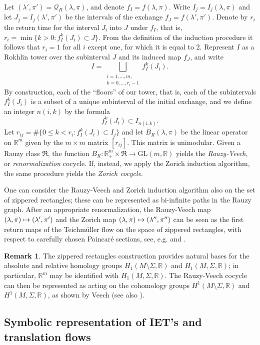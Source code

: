 \documentclass[10pt]{amsart}
\let\mathcal\mathscr
\def\mto{\mathchoice{\longmapsto}{\mapsto}{\mapsto}{\mapsto}}
\newcommand{\GL}{\mathrm{GL}}
\theoremstyle{plain}
\theoremstyle{definition}
\newtheorem*{rem*}{Remark}
\let\lam\lambda
\let\Sig\Sigma
\newcommand\FrR{\mathfrak{R}}
\newcommand\Qk{\mathcal{Q}}
\newcommand{\R}{\mathbb{R}}
\newcommand\be{\begin{equation}}
\newcommand\ee{\end{equation}}
\providecommand{\eg}{e.g.}\providecommand{\ie}{i.e.}\providecommand{\etc}{etc.}\providecommand{\resp}{resp.}\providecommand{\cf}{cf.}
\begin{document}
Let $(\lam',\pi')=\Qk_R(\lam,\pi)$, and denote $f_I=f(\lam,\pi)$. Write $I_j = I_j(\lam,\pi)$ and let $J_j = I_j(\lam',\pi')$ be the intervals of the exchange $f_J=f(\lam',\pi')$. Denote by
$r_i$ the return time for the interval $J_i$ into $J$ under $f_I$, that is,
$r_i = \min\{k>0: f_I^k (J_i) \subset J\}$. From the definition of the induction procedure it follows that $r_i = 1$ for all $i$ except one, for which it is equal to 2.
Represent $I$ as a Rokhlin tower over the subinterval $J$ and its induced map $f_J$, and write
\be \label{Rokhlin1}
I = \bigsqcup_{\substack{i=1,\ldots,m,\\ k = 0, \ldots, r_i-1}} f_I^k (J_i).
\ee
By construction, each of the ``floors'' of our tower, that is, each of the subintervals $f_I^k (J_i)$ is a subset of a unique subinterval of the initial exchange, and we define an integer $n(i,k)$ by the formula
\be \label{Rokhlin2}
f_I^k (J_i) \subset I_{n(i,k)}.
\ee
{ Let $r_{ij} = \#\{0 \le k < r_i: f_I^k(J_i) \subset I_j\}$ and let
$B_R(\lam,\pi)$ be the linear operator on $\R^m$ given by the $m\times m$ matrix $[r_{ij}]$. } This matrix is unimodular. Given a Rauzy class $\FrR$, the function $B_R: \R^m_+\times \FrR \to \GL(m,\R)$ yields the \emph{Rauzy-Veech}, or \emph{renormalization} cocycle. If, instead, we apply the Zorich induction algorithm, the same procedure yields the \emph{Zorich cocycle}.

One can consider the Rauzy-Veech and Zorich induction algorithm also on the set of zippered rectangles; these can be represented as bi-infinite paths in the Rauzy graph. After an appropriate renormalization, the Rauzy-Veech map $(\lam,\pi)\mto (\lam',\pi')$ and the Zorich map $(\lam,\pi) \mto (\lam'',\pi'')$ can be seen as the first return maps of the Teichmüller flow on the space of zippered rectangles, with respect to carefully chosen Poincaré sections, see, \eg \cite[\S2.10]{viana2} and \cite[\S11.3]{yoccoz}.

\begin{rem*}
The zippered rectangles construction provides natural bases for the absolute and relative homology groups $H_1(M\setminus \Sig,\R)$ and $H_1(M,\Sig,\R)$; in particular, $\R^m$ may be identified with $H_1(M,\Sig,\R)$. The Rauzy-Veech cocycle can then be represented as acting on the cohomology groups
$H^1(M\setminus \Sig,\R)$ and $H^1(M,\Sig,\R)$, as shown by Veech \cite{veech} (see also \cite[\S2.9]{viana2}).
\end{rem*}


\subsection{Symbolic representation of IET's and translation flows} \label{subsec-symbol}
\end{document}

